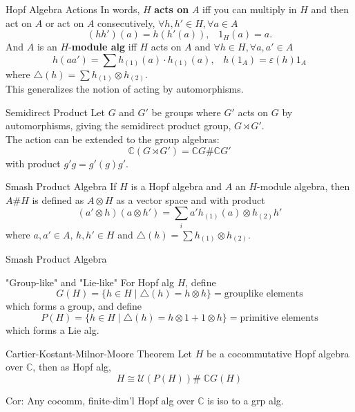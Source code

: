 \documentclass{beamer}
\newcommand\1{_{(1)}}
\newcommand\2{_{(2)}}
\begin{document}
\begin{frame}{Hopf Algebra Actions}
In words, $H$ \textbf{acts on} $A$ iff you can multiply in $H$ and then act on $A$ or act on $A$ consecutively, $\forall h,h'\in H,\forall a\in A$
\[
(hh')(a)=h(h'(a)),\;\;\; 1_H(a)=a. 
\]
And $A$ is an $H$-\textbf{module alg} iff $H$ acts on $A$ and $\forall h\in H,\forall a,a'\in A$
\[
h(aa')=\sum h\1(a)\cdot h\1(a),\;\;\; h(1_A)=\varepsilon(h)1_A    
\]
where $\triangle(h)=\sum h\1\otimes h\2$.
\\ This generalizes the notion of acting by automorphisms.

\end{frame}

\begin{frame}{Semidirect Product}
    Let $G$ and $G'$ be groups where $G'$ acts on $G$ by automorphisms, giving the semidirect product group, $G\rtimes G'$.\\
    The action can be extended to the group algebras:
    \[
    \mathbb{C}(G\rtimes G')=\mathbb{C}G\#\mathbb{C}G'    
    \]
    with product $g'g=g'(g)g'$.\\
    \begin{block}{Smash Product Algebra}
        If $H$ is a Hopf algebra and $A$ an $H$-module algebra, then $A\#H$ is defined as $A\otimes H$ as a vector space and with product
        \[
        (a'\otimes h)(a\otimes h')=\sum_{i} a'h\1(a)\otimes h\2h' 
        \]
        where $a,a'\in A$, $h,h'\in H$ and $\triangle(h)=\sum h\1\otimes h\2$.
    \end{block}
\end{frame}

\begin{frame}{Smash Product Algebra}
    \begin{block}{"Group-like" and "Lie-like"}
        For Hopf alg $H$, define \[G(H)=\{h\in H\;\vert\; \triangle(h)=h\otimes h\}=\text{grouplike elements}\] 
        which forms a group, and define 
        \[P(H)=\{h\in H\;\vert\; \triangle(h)=h\otimes 1+1\otimes h\}=\text{primitive elements}\]
        which forms a Lie alg.
    \end{block}
    \begin{block}{Cartier-Kostant-Milnor-Moore Theorem}
        Let $H$ be a cocommutative Hopf algebra over $\mathbb{C}$, then as Hopf alg,
        \[
            H\cong \mathcal{U}\left(P(H)\right)\# \;\mathbb{C}G(H)
        \]
    \end{block}
    Cor: Any cocomm, finite-dim'l Hopf alg over $\mathbb{C}$ is iso to a grp alg.
\end{frame}
\end{document}
